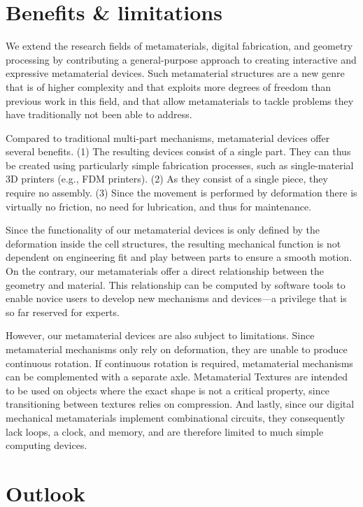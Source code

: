 \section{Benefits \& limitations}

We extend the research fields of metamaterials, digital fabrication, and geometry processing by contributing a general-purpose approach to creating interactive and expressive metamaterial devices. Such metamaterial structures are a new genre that is of higher complexity and that exploits more degrees of freedom than previous work in this field, and that allow metamaterials to tackle problems they have traditionally not been able to address. 

Compared to traditional multi-part mechanisms, metamaterial devices offer several benefits. (1) The resulting devices consist of a single part. They can thus be created using particularly simple fabrication processes, such as single-material 3D printers (e.g., FDM printers). (2) As they consist of a single piece, they require no assembly. (3) Since the movement is performed by deformation there is virtually no friction, no need for lubrication, and thus for maintenance.

Since the functionality of our metamaterial devices is only defined by the deformation inside the cell structures, the resulting mechanical function is not dependent on engineering fit and play between parts to ensure a smooth motion. On the contrary, our metamaterials offer a direct relationship between the geometry and material. This relationship can be computed by software tools to enable novice users to develop new mechanisms and devices---a privilege that is so far reserved for experts.

However, our metamaterial devices are also subject to limitations. Since metamaterial mechanisms only rely on deformation, they are unable to produce continuous rotation. If continuous rotation is required, metamaterial mechanisms can be complemented with a separate axle. Metamaterial Textures are intended to be used on objects where the exact shape is not a critical property, since transitioning between textures relies on compression. And lastly, since our digital mechanical metamaterials implement combinational circuits, they consequently lack loops, a clock, and memory, and are therefore limited to much simple computing devices.

\section{Outlook}


